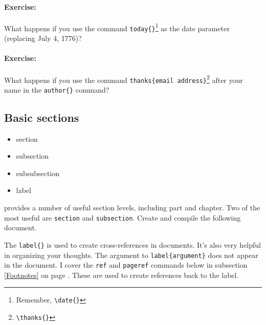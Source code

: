         \paragraph{Exercise:}What happens if you use the command \texttt{today\{\}}\footnote{Remember, \texttt{\textbackslash{}date\{\}}} as the date parameter (replacing July 4, 1776)?

        \paragraph{Exercise:}What happens if you use the command \texttt{thanks\{email address\}}\footnote{\texttt{\textbackslash{}thanks\{\}}} after your name in the \texttt{author\{\}} command?

        \subsection{Basic sections}
        \label{Basic-sections}
        
        \begin{framed}
            \begin{itemize}
                \item{section}
                \item{subsection}
                \item{subsubsection}
                \item{label}
            \end{itemize}
        \end{framed}

        \LaTeXe{} provides a number of useful section levels, including part and chapter. Two of the most useful are \texttt{section} and \texttt{subsection}. Create and compile the following document. 

        The \texttt{label\{\}} is used to create cross-references in documents. It's also very helpful in organizing your thoughts. The argument to \texttt{label\{argument\}} does not appear in the document. I cover the \texttt{ref} and \texttt{pageref} commands below in subsection \ref{Footnotes} on page \pageref{Footnotes}. These are used to create references back to the label.

